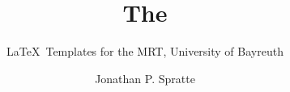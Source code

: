 \documentclass[oneside,UKenglish]{MRTthesis}
\title{The \cls{MRTbundle}}
\subtitle{\LaTeX\ Templates for the MRT, University of Bayreuth}
\author{Jonathan P. Spratte}
\begin{document}
\maketitle
\tableofcontents
\mainpart






\end{document}
